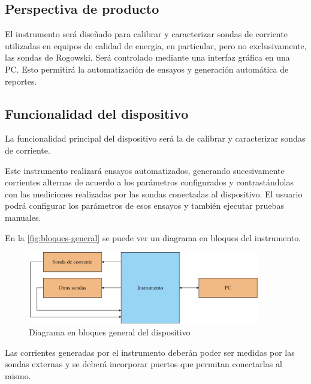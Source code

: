 \documentclass[titlepage, 12pt]{article}
\begin{document}
  \subsection{Perspectiva de producto}
  El instrumento será diseñado para calibrar y caracterizar sondas de corriente utilizadas en equipos de calidad de energia, en particular, pero no exclusivamente, las sondas de Rogowski. Será controlado mediante una interfaz gráfica en una PC. Esto permitirá la automatización de ensayos y generación automática de reportes.

  \subsection{Funcionalidad del dispositivo}
  La funcionalidad principal del dispositivo será la de calibrar y caracterizar sondas de corriente.

  Este instrumento realizará ensayos automatizados, generando sucesivamente corrientes alternas de acuerdo a los parámetros configurados y contrastándolas con las mediciones realizadas por las sondas conectadas al dispositivo. El usuario podrá configurar los parámetros de esos ensayos y también ejecutar pruebas manuales.

  En la \autoref{fig:bloques-general} se puede ver un diagrama en bloques del instrumento.

  \begin{figure}[!htbp]
    \centering
    \includegraphics[width=0.9\textwidth]{diagrams/bloques-general.png}
    \caption{Diagrama en bloques general del dispositivo}
    \label{fig:bloques-general}
  \end{figure}

  Las corrientes generadas por el instrumento deberán poder ser medidas por las sondas externas y se deberá incorporar puertos que permitan conectarlas al mismo.

\end{document}
